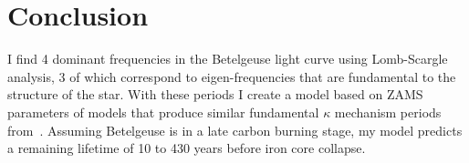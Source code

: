 \documentclass[11pt,twocolumn]{article}
\begin{document}
\section{Conclusion}

I find 4 dominant frequencies in the Betelgeuse light curve using Lomb-Scargle analysis, 3 of which correspond to eigen-frequencies that are fundamental to the structure of the star. With these periods I create a model based on ZAMS parameters of models that produce similar fundamental $\kappa$ mechanism periods from~\citep{saio}. Assuming Betelgeuse is in a late carbon burning stage, my model predicts a remaining lifetime of 10 to 430 years before iron core collapse.



\end{document}
